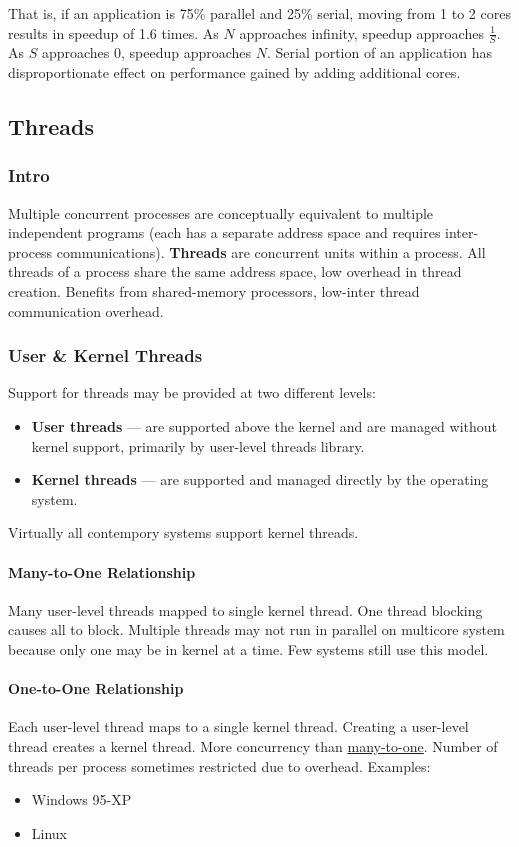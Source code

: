 \documentclass{article}%
\begin{document}
That is, if an application is 75\% parallel and 25\% serial, moving from 1 to 2 cores results in speedup of 1.6 times.
As $N$ approaches infinity, speedup approaches $\frac{1}{S}$.
As $S$ approaches 0, speedup approaches $N$.
Serial portion of an application has disproportionate effect on performance gained by adding additional cores.

\subsection{Threads}
\subsubsection{Intro}
Multiple concurrent processes are conceptually equivalent to multiple independent programs (each has a separate address space and requires inter-process communications).
\textbf{Threads} are concurrent units within a process.
All threads of a process share the same address space, low overhead in thread creation.
Benefits from shared-memory processors, low-inter thread communication overhead.

\subsubsection{User \& Kernel Threads}
Support for threads may be provided at two different levels:
\begin{itemize}
	\item \textbf{User threads} --- are supported above the kernel and are managed without kernel support, primarily by user-level threads library.
	\item \textbf{Kernel threads} --- are supported and managed directly by the operating system.
\end{itemize}
Virtually all contempory systems support kernel threads.

\paragraph{Many-to-One Relationship}
\label{sec:manytoone}

Many user-level threads mapped to single kernel thread.
One thread blocking causes all to block.
Multiple threads may not run in parallel on multicore system because only one may be in kernel at a time.
Few systems still use this model.

\paragraph{One-to-One Relationship}
Each user-level thread maps to a single kernel thread.
Creating a user-level thread creates a kernel thread.
More concurrency than \hyperref[sec:manytoone]{many-to-one}.
Number of threads per process sometimes restricted due to overhead.
Examples:
\begin{itemize}
	\item Windows 95-XP
	\item Linux
\end{itemize}
\end{document}
